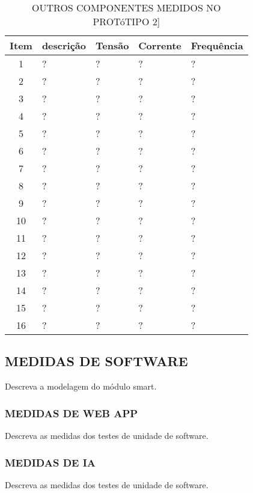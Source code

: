 \begin{table}
	\centering
	\caption{OUTROS COMPONENTES MEDIDOS NO PROTóTIPO 2]}
	\begin{tabular}{ |c | p{3cm}| p{3cm} |p{3cm} | p{3cm} | } \hline
		\textbf{ Item} 	   & \textbf{descrição}	&\textbf{Tensão} &\textbf{Corrente} &\textbf{Frequência} \\ \hline
		1  & ? & ? & ? & ? \\ \hline
		2  & ? & ? & ? & ? \\ \hline
		3  & ? & ? & ? & ? \\ \hline
		4  & ? & ? & ? & ? \\ \hline
		5  & ? & ? & ? & ?\\ \hline
		6  & ? & ? & ? & ?\\ \hline
		7  & ? & ? & ? & ?\\ \hline
		8  & ? & ? & ? & ?\\ \hline
		9  & ? & ? & ? & ?\\ \hline
		10  & ? & ? & ? & ?\\ \hline
		11 & ? & ? & ? & ?\\ \hline
		12 & ? & ? & ? & ?\\ \hline
		13 & ? & ? & ? & ?\\ \hline
		14 & ? & ? & ? & ?\\ \hline
		15 & ? & ? & ? & ?\\ \hline
		16 & ? & ? & ? & ?\\ \hline
		
		
	\end{tabular}					
	
	
	\label{T15}\par
\end{table}


\subsection{MEDIDAS DE SOFTWARE}
Descreva a modelagem do módulo smart.


\subsubsection{MEDIDAS DE WEB APP}
Descreva as medidas dos testes de unidade de software.

\subsubsection{MEDIDAS DE IA}
Descreva as medidas dos testes de unidade de software.





